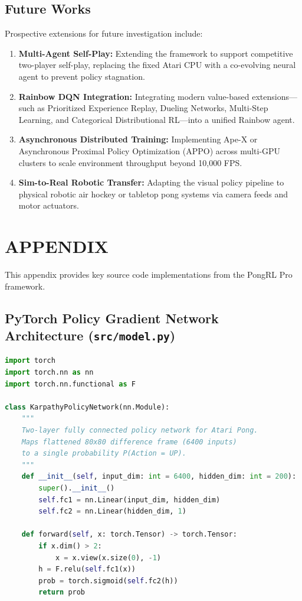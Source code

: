 \documentclass[12pt,a4paper]{report}
\begin{document}
\section{Future Works}
Prospective extensions for future investigation include:
\begin{enumerate}
    \item \textbf{Multi-Agent Self-Play:} Extending the framework to support competitive two-player self-play, replacing the fixed Atari CPU with a co-evolving neural agent to prevent policy stagnation.
    \item \textbf{Rainbow DQN Integration:} Integrating modern value-based extensions—such as Prioritized Experience Replay, Dueling Networks, Multi-Step Learning, and Categorical Distributional RL—into a unified Rainbow agent.
    \item \textbf{Asynchronous Distributed Training:} Implementing Ape-X or Asynchronous Proximal Policy Optimization (APPO) across multi-GPU clusters to scale environment throughput beyond 10,000 FPS.
    \item \textbf{Sim-to-Real Robotic Transfer:} Adapting the visual policy pipeline to physical robotic air hockey or tabletop pong systems via camera feeds and motor actuators.
\end{enumerate}

\newpage
\chapter{APPENDIX}

This appendix provides key source code implementations from the PongRL Pro framework.

\section{PyTorch Policy Gradient Network Architecture (\texttt{src/model.py})}
\begin{lstlisting}[language=Python, caption={Karpathy Policy Gradient Neural Network Implementation}]
import torch
import torch.nn as nn
import torch.nn.functional as F

class KarpathyPolicyNetwork(nn.Module):
    """
    Two-layer fully connected policy network for Atari Pong.
    Maps flattened 80x80 difference frame (6400 inputs)
    to a single probability P(Action = UP).
    """
    def __init__(self, input_dim: int = 6400, hidden_dim: int = 200):
        super().__init__()
        self.fc1 = nn.Linear(input_dim, hidden_dim)
        self.fc2 = nn.Linear(hidden_dim, 1)

    def forward(self, x: torch.Tensor) -> torch.Tensor:
        if x.dim() > 2:
            x = x.view(x.size(0), -1)
        h = F.relu(self.fc1(x))
        prob = torch.sigmoid(self.fc2(h))
        return prob
\end{lstlisting}
\end{document}
